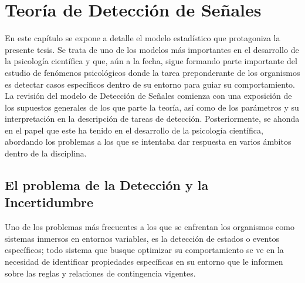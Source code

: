 
\chapter{Teoría de Detección de Señales} %

\label{Cap_SDT} %


\newcommand{\keyword}[1]{\textbf{#1}}
\newcommand{\tabhead}[1]{\textbf{#1}}
\newcommand{\code}[1]{\texttt{#1}}
\newcommand{\file}[1]{\texttt{\bfseries#1}}
\newcommand{\option}[1]{\texttt{\itshape#1}}


En este capítulo se expone a detalle el modelo estadístico que protagoniza la presente tesis. Se trata de uno de los modelos más importantes en el desarrollo de la psicología científica y que, aún a la fecha, sigue formando parte importante del estudio de fenómenos psicológicos donde la tarea preponderante de los organismos es detectar casos específicos dentro  de su entorno para guiar su comportamiento.\\

La revisión del modelo de Detección de Señales comienza con una exposición de los supuestos generales de los que parte la teoría, así como de los parámetros y su interpretación en la descripción de tareas de detección. Posteriormente, se ahonda en el papel que este ha tenido en el desarrollo de la psicología científica, abordando los problemas a los que se intentaba dar respuesta en varios ámbitos dentro de la disciplina.

\section{El problema de la Detección y la Incertidumbre}

Uno de los problemas más frecuentes a los que se enfrentan los organismos como sistemas inmersos en entornos variables, es la detección de estados o eventos específicos; todo sistema que busque optimizar su comportamiento se ve en la necesidad de identificar propiedades específicas en su entorno que le informen sobre las reglas y relaciones de contingencia vigentes.\\

